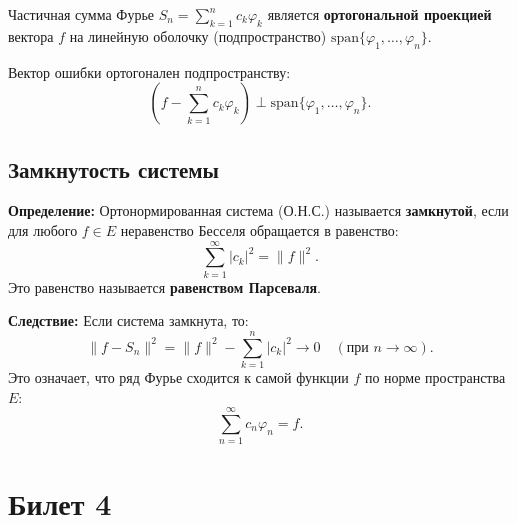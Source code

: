 \documentclass[12pt,a4paper,openany]{book}
\begin{document}
Частичная сумма Фурье $S_n = \sum_{k=1}^n c_k \varphi_k$ является \textbf{ортогональной проекцией} вектора $f$ на линейную оболочку (подпространство) $\text{span}\{\varphi_1, \dots, \varphi_n\}$.

Вектор ошибки ортогонален подпространству:
\[
\left( f - \sum_{k=1}^n c_k \varphi_k \right) \perp \text{span}\{\varphi_1, \dots, \varphi_n\}.
\]

\begin{center}
\end{center}

\section{Замкнутость системы}

\textbf{Определение:}
Ортонормированная система (О.Н.С.) называется \textbf{замкнутой}, если для любого $f \in E$ неравенство Бесселя обращается в равенство:
\[
\sum_{k=1}^\infty |c_k|^2 = \|f\|^2.
\]
Это равенство называется \textbf{равенством Парсеваля}.

\textbf{Следствие:}
Если система замкнута, то:
\[
\|f - S_n\|^2 = \|f\|^2 - \sum_{k=1}^n |c_k|^2 \to 0 \quad (\text{при } n \to \infty).
\]
Это означает, что ряд Фурье сходится к самой функции $f$ по норме пространства $E$:
\[
\sum_{n=1}^\infty c_n \varphi_n = f.
\]
\chapter{Билет 4 }
\end{document}
